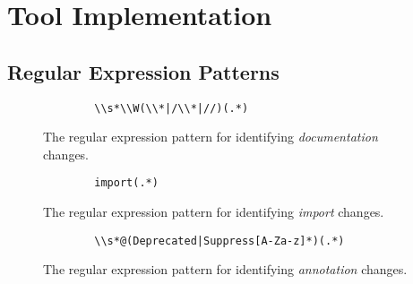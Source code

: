 \chapter{Tool Implementation}


\section{Regular Expression Patterns}
\label{sec:Reg-Ex-Patterns}

\begin{figure}[h]
    \begin{verbatim}
        \\s*\\W(\\*|/\\*|//)(.*)
    \end{verbatim}
    \caption{The regular expression pattern for identifying \textit{documentation} changes.}
\end{figure}

\begin{figure}[h]
    \begin{verbatim}
        import(.*)
    \end{verbatim}
    \caption{The regular expression pattern for identifying \textit{import} changes.}
\end{figure}

\begin{figure}[h]
    \begin{verbatim}
        \\s*@(Deprecated|Suppress[A-Za-z]*)(.*)
    \end{verbatim}
    \caption{The regular expression pattern for identifying \textit{annotation} changes.}
\end{figure}

\endinput
